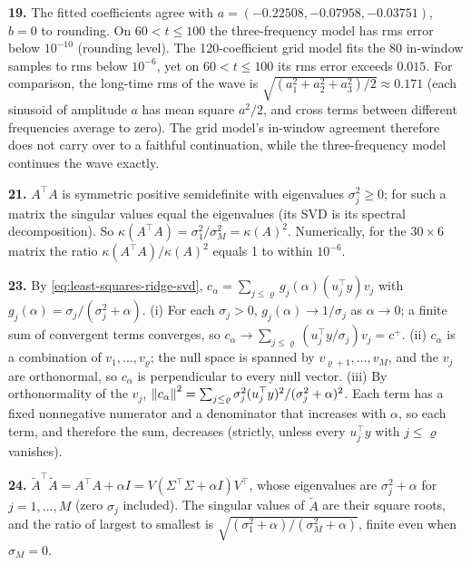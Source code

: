 \textbf{19.} The fitted coefficients agree with $a = (-0.22508,-0.07958,-0.03751)$, $b = 0$ to rounding. On $60<t\le100$ the three-frequency model has rms error below $10^{-10}$ (rounding level). The 120-coefficient grid model fits the 80 in-window samples to rms below $10^{-6}$, yet on $60<t\le100$ its rms error exceeds $0.015$. For comparison, the long-time rms of the wave is $\sqrt{(a_1^2+a_2^2+a_3^2)/2}\approx0.171$ (each sinusoid of amplitude $a$ has mean square $a^2/2$, and cross terms between different frequencies average to zero). The grid model's in-window agreement therefore does not carry over to a faithful continuation, while the three-frequency model continues the wave exactly.

\textbf{21.} $A^\top A$ is symmetric positive semidefinite with eigenvalues $\sigma_j^2\ge0$; for such a matrix the singular values equal the eigenvalues (its SVD is its spectral decomposition). So $\kappa(A^\top A) = \sigma_1^2/\sigma_M^2 = \kappa(A)^2$. Numerically, for the $30\times6$ matrix the ratio $\kappa(A^\top A)/\kappa(A)^2$ equals 1 to within $10^{-6}$.

\textbf{23.} By \cref{eq:least-squares-ridge-svd}, $c_\alpha = \sum_{j\le\varrho}g_j(\alpha)(u_j^\top y)v_j$ with $g_j(\alpha) = \sigma_j/(\sigma_j^2+\alpha)$. (i) For each $\sigma_j>0$, $g_j(\alpha)\to1/\sigma_j$ as $\alpha\to0$; a finite sum of convergent terms converges, so $c_\alpha\to\sum_{j\le\varrho}(u_j^\top y/\sigma_j)v_j = c^+$. (ii) $c_\alpha$ is a combination of $v_1,\dots,v_\varrho$; the null space is spanned by $v_{\varrho+1},\dots,v_M$, and the $v_j$ are orthonormal, so $c_\alpha$ is perpendicular to every null vector. (iii) By orthonormality of the $v_j$, $\left\lVert c_\alpha\right\rVert^2 = \sum_{j\le\varrho}\sigma_j^2(u_j^\top y)^2/(\sigma_j^2+\alpha)^2$. Each term has a fixed nonnegative numerator and a denominator that increases with $\alpha$, so each term, and therefore the sum, decreases (strictly, unless every $u_j^\top y$ with $j\le\varrho$ vanishes).

\textbf{24.} $\tilde A^\top\tilde A = A^\top A + \alpha I = V(\Sigma^\top\Sigma+\alpha I)V^\top$, whose eigenvalues are $\sigma_j^2+\alpha$ for $j = 1,\dots,M$ (zero $\sigma_j$ included). The singular values of $\tilde A$ are their square roots, and the ratio of largest to smallest is $\sqrt{(\sigma_1^2+\alpha)/(\sigma_M^2+\alpha)}$, finite even when $\sigma_M = 0$.

